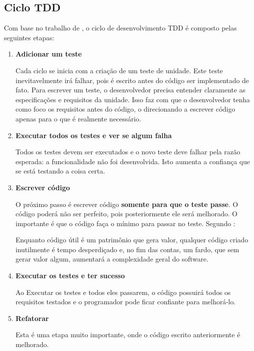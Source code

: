 \subsection{Ciclo TDD}
\label{ssub:ciclo_tdd}

Com base no trabalho de , o ciclo de desenvolvimento TDD é composto pelas seguintes etapas:

\begin{enumerate}
\item \textbf{Adicionar um teste}

Cada ciclo se inicia com a criação de um teste de unidade. Este teste inevitavelmente irá falhar, pois é escrito antes do código ser implementado de fato. Para escrever um teste, o desenvolvedor precisa entender claramente as especificações e requisitos da unidade. Isso faz com que o desenvolvedor tenha como foco os requisitos antes do código, o direcionando a escrever código apenas para o que é realmente necessário.

\item \textbf{Executar todos os testes e ver se algum falha}

Todos os testes devem ser executados e o novo teste deve falhar pela razão esperada: a funcionalidade não foi desenvolvida. Isto aumenta a confiança que se está testando a coisa certa.

\item \textbf{Escrever código}

O próximo passo é escrever código \textbf{somente para que o teste passe}. O código poderá não ser perfeito, pois posteriormente ele será melhorado. O importante é que o código faça o mínimo para passar no teste. Segundo :

\begin{citacao}
Enquanto código útil é um patrimônio que gera valor, qualquer código criado inutilmente é tempo desperdiçado e, no fim das contas, um fardo, que sem gerar valor algum, aumentará a complexidade geral do software.
\end{citacao}

\item \textbf{Executar os testes e ter sucesso}

Ao Executar os testes e todos eles passarem, o código possuirá todos os requisitos testados e o programador pode ficar confiante para melhorá-lo.

\item \textbf{Refatorar}

Esta é uma etapa muito importante, onde o código escrito anteriormente é melhorado.


\end{enumerate}

